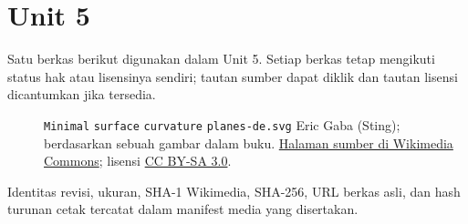 \section*{Unit 5}
Satu berkas berikut digunakan dalam Unit 5. Setiap berkas tetap mengikuti status hak atau lisensinya sendiri; tautan sumber dapat diklik dan tautan lisensi dicantumkan jika tersedia.
\begin{description}
\item[]\texttt{Minimal} \texttt{surface} \texttt{curvature} \texttt{planes-de.svg}
Eric Gaba (Sting); berdasarkan sebuah gambar dalam buku.
\href{https://commons.wikimedia.org/wiki/File:Minimal_surface_curvature_planes-de.svg}{Halaman sumber di Wikimedia Commons}; lisensi \href{https://creativecommons.org/licenses/by-sa/3.0/}{CC BY-SA 3.0}.
\end{description}
Identitas revisi, ukuran, SHA-1 Wikimedia, SHA-256, URL berkas asli, dan hash turunan cetak tercatat dalam manifest media yang disertakan.

